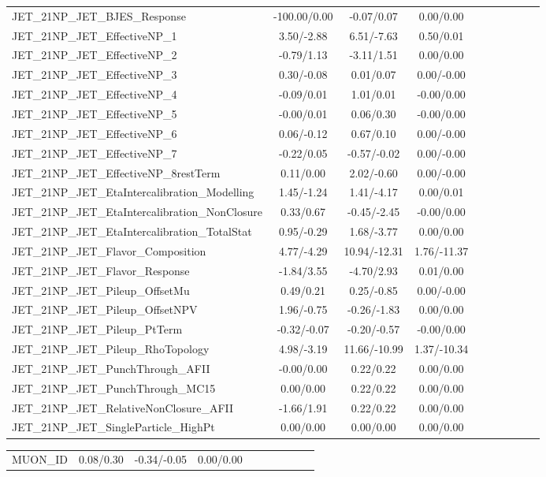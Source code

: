 \begin{table}[h]
\begin{center}
\begin{tabular}{l|ccccccccc}
JET\_21NP\_JET\_BJES\_Response &-100.00/0.00 &-0.07/0.07 &0.00/0.00 \\
JET\_21NP\_JET\_EffectiveNP\_1 &3.50/-2.88 &6.51/-7.63 &0.50/0.01 \\
JET\_21NP\_JET\_EffectiveNP\_2 &-0.79/1.13 &-3.11/1.51 &0.00/0.00 \\
JET\_21NP\_JET\_EffectiveNP\_3 &0.30/-0.08 &0.01/0.07 &0.00/-0.00 \\
JET\_21NP\_JET\_EffectiveNP\_4 &-0.09/0.01 &1.01/0.01 &-0.00/0.00 \\
JET\_21NP\_JET\_EffectiveNP\_5 &-0.00/0.01 &0.06/0.30 &-0.00/0.00 \\
JET\_21NP\_JET\_EffectiveNP\_6 &0.06/-0.12 &0.67/0.10 &0.00/-0.00 \\
JET\_21NP\_JET\_EffectiveNP\_7 &-0.22/0.05 &-0.57/-0.02 &0.00/-0.00 \\
JET\_21NP\_JET\_EffectiveNP\_8restTerm &0.11/0.00 &2.02/-0.60 &0.00/-0.00 \\
JET\_21NP\_JET\_EtaIntercalibration\_Modelling &1.45/-1.24 &1.41/-4.17 &0.00/0.01 \\
JET\_21NP\_JET\_EtaIntercalibration\_NonClosure &0.33/0.67 &-0.45/-2.45 &-0.00/0.00 \\
JET\_21NP\_JET\_EtaIntercalibration\_TotalStat &0.95/-0.29 &1.68/-3.77 &0.00/0.00 \\
JET\_21NP\_JET\_Flavor\_Composition &4.77/-4.29 &10.94/-12.31 &1.76/-11.37 \\
JET\_21NP\_JET\_Flavor\_Response &-1.84/3.55 &-4.70/2.93 &0.01/0.00 \\
JET\_21NP\_JET\_Pileup\_OffsetMu &0.49/0.21 &0.25/-0.85 &0.00/-0.00 \\
JET\_21NP\_JET\_Pileup\_OffsetNPV &1.96/-0.75 &-0.26/-1.83 &0.00/0.00 \\
JET\_21NP\_JET\_Pileup\_PtTerm &-0.32/-0.07 &-0.20/-0.57 &-0.00/0.00 \\
JET\_21NP\_JET\_Pileup\_RhoTopology &4.98/-3.19 &11.66/-10.99 &1.37/-10.34 \\
JET\_21NP\_JET\_PunchThrough\_AFII &-0.00/0.00 &0.22/0.22 &0.00/0.00 \\
JET\_21NP\_JET\_PunchThrough\_MC15 &0.00/0.00 &0.22/0.22 &0.00/0.00 \\
JET\_21NP\_JET\_RelativeNonClosure\_AFII &-1.66/1.91 &0.22/0.22 &0.00/0.00 \\
JET\_21NP\_JET\_SingleParticle\_HighPt &0.00/0.00 &0.00/0.00 &0.00/0.00 \\
\hline \end{tabular} \end{center} \end{table} \begin{table}[h] \scriptsize \begin{center} \begin{tabular}{l|ccccccccc} \hline MUON\_ID &0.08/0.30 &-0.34/-0.05 &0.00/0.00 \\

\end{tabular}
\end{center}
\end{table}
